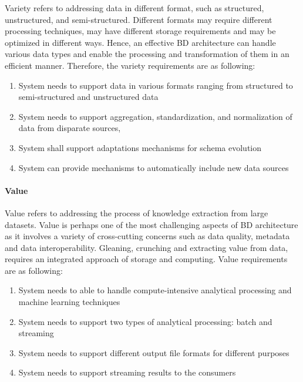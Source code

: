 \documentclass{bmcart}
\begin{document}
Variety refers to addressing data in different format, such as structured, unstructured, and semi-structured. Different formats may require different processing techniques, may have different storage requirements and may be optimized in different ways. Hence, an effective BD architecture can handle various data types and enable the processing and transformation of them in an efficient manner. Therefore, the variety requirements are as following: 

\begin{enumerate}[label=\textbf{Var-\arabic*}]
    \item System needs to support data in various formats ranging from structured to semi-structured and unstructured data
    \item System needs to support aggregation, standardization, and normalization of data from disparate sources,
    \item System shall support adaptations mechanisms for schema evolution
    \item System can provide mechanisms to automatically include new data sources
\end{enumerate}


\paragraph{Value}

Value refers to addressing the process of knowledge extraction from large datasets. Value is perhaps one of the most challenging aspects of BD architecture as it involves a variety of cross-cutting concerns such as data quality, metadata and data interoperability. Gleaning, crunching and extracting value from data, requires an integrated approach of storage and computing. Value requirements are as following:

\begin{enumerate}[label=\textbf{Val-\arabic*}]
    \item System needs to able to handle compute-intensive analytical processing and machine learning techniques
    \item System needs to support two types of analytical processing: batch and streaming
    \item System needs to support different output file formats for different purposes
    \item System needs to support streaming results to the consumers 
\end{enumerate}
\end{document}
